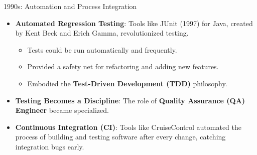 \documentclass{beamer}
\begin{document}
\begin{frame}{1990s: Automation and Process Integration}
\begin{itemize}
    \item \textbf{Automated Regression Testing}: Tools like JUnit (1997) for Java, created by Kent Beck and Erich Gamma, revolutionized testing.
    \begin{itemize}
        \item Tests could be run automatically and frequently.
        \item Provided a safety net for refactoring and adding new features.
        \item Embodied the \textbf{Test-Driven Development (TDD)} philosophy.
    \end{itemize}
    \item \textbf{Testing Becomes a Discipline}: The role of \textbf{Quality Assurance (QA) Engineer} became specialized.
    \item \textbf{Continuous Integration (CI)}: Tools like CruiseControl automated the process of building and testing software after every change, catching integration bugs early.
\end{itemize}
\begin{center}
\end{center}
\end{frame}
\end{document}
